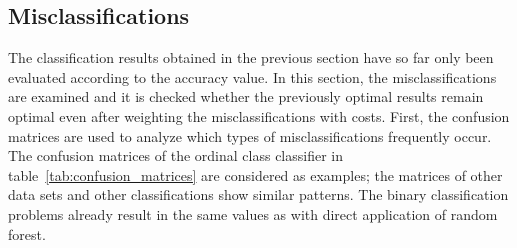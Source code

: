 \documentclass[article,type=msc,colorback,accentcolor=tud7b]{tudthesis}
\begin{document}
    \begin{table}[H]
      \quad      
      \caption{Comparison of the best achieved accuracies}
      \label{tab:comparison_accuracies}
	\end{table}
  \clearpage

  \subsection{Misclassifications}
    The classification results obtained in the previous section have so far only been evaluated according to the accuracy value. In this section, the misclassifications are examined and it is checked whether the previously optimal results remain optimal even after weighting the misclassifications with costs. First, the confusion matrices are used to analyze which types of misclassifications frequently occur. The confusion matrices of the ordinal class classifier in table~\ref{tab:confusion_matrices} are considered as examples; the matrices of other data sets and other classifications show similar patterns. The binary classification problems already result in the same values as with direct application of random forest.
      
\end{document}
